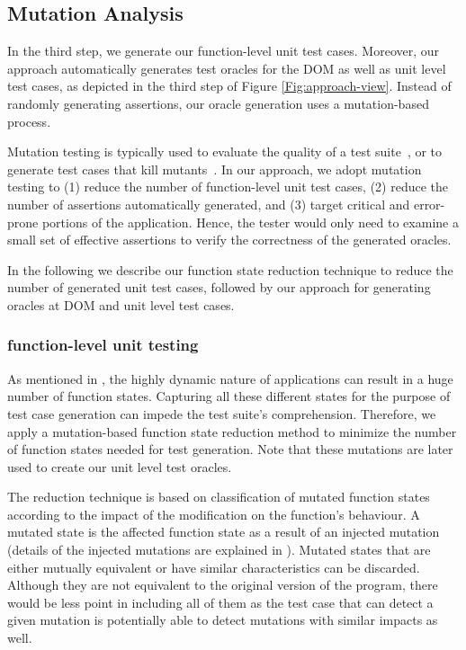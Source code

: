 \subsection{Mutation Analysis} \label{Sec:mutationAnalysis}
In the third step, we generate our function-level unit test cases. Moreover, our approach automatically generates test oracles for the DOM as well as unit level test cases, as depicted in the third step of Figure \ref{Fig:approach-view}. 
Instead of randomly generating assertions, our oracle generation uses a mutation-based process.

Mutation testing is typically used to evaluate the quality of a test suite~\cite{demillo:computer1978}, or to generate test cases that kill mutants~\cite{fraser:tse12}. In our approach, we adopt mutation testing to (1) reduce the number of function-level unit test cases, (2) reduce the number of assertions automatically generated, and (3) target critical  and error-prone portions of the application. 
Hence, the tester would only need to examine a small set of effective assertions to verify the correctness of the generated oracles.

In the following we describe our function state reduction technique to reduce the number of generated unit test cases, followed by our approach for generating oracles at DOM and unit level test cases.   

\subsubsection{\javascript function-level unit testing} \label{Sec:jsFuncTest}

As mentioned in , the highly dynamic nature of \javascript applications can result in a huge number of function states. Capturing all these different states for the purpose of test case generation can impede the test suite's comprehension. 
Therefore, we apply a mutation-based function state reduction method to minimize the number of function states needed for test generation. Note that these mutations are later used to create our unit level test oracles.

 The reduction technique is based on classification of mutated function states according to the impact of the modification on the function's behaviour. A mutated state is the affected function state as a result of an injected mutation (details of the injected mutations are explained in ). 
Mutated states that are either mutually equivalent or have similar characteristics can be discarded. Although they are not equivalent to the original version of the program, there would be less point in including all of them as the test case that can detect a given mutation is potentially able to detect mutations with similar impacts as well.

